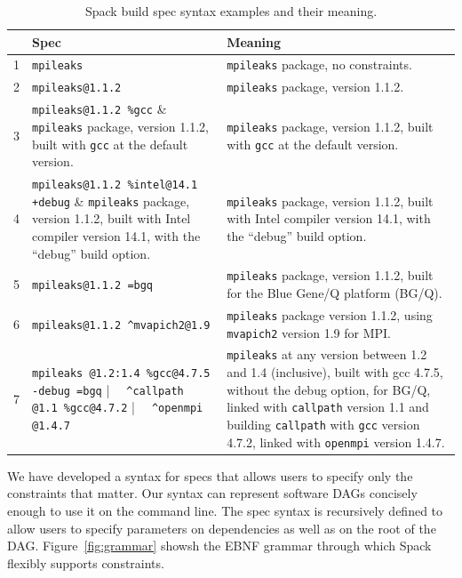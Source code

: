 \begin{table}\centering
\begin{tabular}{|r|p{2.4in}|p{4in}|}
\hline
& {\bf Spec} & {\bf Meaning} \\
\hline
\hline
1&\small\verb|mpileaks|                         & \small {\tt mpileaks} package, no constraints. \\\hline
2&\small\verb|mpileaks@1.1.2|                   & \small {\tt mpileaks} package, version 1.1.2. \\\hline
3&\small\verb|mpileaks@1.1.2 %gcc|              & \small {\tt mpileaks} package, version 1.1.2, built with {\tt gcc} at the default version. \\\hline
4&\small\verb|mpileaks@1.1.2 %intel@14.1 +debug| & \small {\tt mpileaks} package, version 1.1.2, built with Intel compiler version 14.1, \newline with the ``debug'' build option. \\\hline
5&\small\verb|mpileaks@1.1.2 =bgq|              & \small {\tt mpileaks} package, version 1.1.2, built for the Blue Gene/Q platform (BG/Q). \\\hline
6&\small\verb|mpileaks@1.1.2 ^mvapich2@1.9|     & \small {\tt mpileaks} package version 1.1.2, using {\tt mvapich2}  version 1.9 for MPI. \\\hline
7&\small\verb|mpileaks @1.2:1.4 %gcc@4.7.5 -debug =bgq| \newline
      \verb|  ^callpath @1.1 %gcc@4.7.2| \newline
      \verb|  ^openmpi @1.4.7|                & \small%
      {\tt mpileaks} at any version between 1.2 and 1.4 (inclusive), built with gcc 4.7.5,
      without the debug option, for BG/Q, linked with {\tt callpath} version 1.1
      and building {\tt callpath} with {\tt gcc} version 4.7.2, linked with {\tt openmpi} version 1.4.7.    \\
\hline
\end{tabular}
\caption{
	Spack build spec syntax examples and their meaning.
	\label{tab:specs}
}
\end{table}

We have developed a syntax for specs that allows users to specify
only the constraints that matter. Our syntax can represent software 
DAGs concisely enough to use it on the command 
line. The spec syntax is recursively defined to allow users to specify
parameters on dependencies as well as on the root of the DAG. 
Figure~\ref{fig:grammar} showsh the EBNF grammar through which Spack 
flexibly supports constraints.

